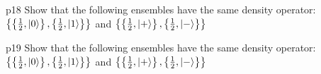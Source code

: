 \documentclass[a4paper, 11pt]{article}
\begin{document}

\begin{problem}{%
	}{p18%
	}
	Show that the following ensembles have the same density operator: $\left\{\left\{\frac12,\ket{0}\right\},\left\{\frac12,\ket{1}\right\}\right\}$ and $\left\{\left\{\frac12,\ket{+}\right\},\left\{\frac12,\ket{-}\right\}\right\}$
\end{problem}


\begin{problem}{%
	}{p19%
	}
	Show that the following ensembles have the same density operator: $\left\{\left\{\frac12,\ket{0}\right\},\left\{\frac12,\ket{1}\right\}\right\}$ and $\left\{\left\{\frac12,\ket{+}\right\},\left\{\frac12,\ket{-}\right\}\right\}$
\end{problem}
\end{document}
